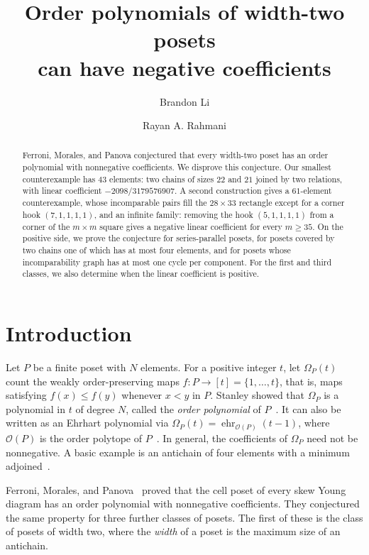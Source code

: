 \documentclass[11pt]{amsart}
\title{Order polynomials of width-two posets\\ can have negative coefficients}
\author{Brandon Li}
\author{Rayan A. Rahmani}
\theoremstyle{remark}
\numberwithin{equation}{section}
\begin{document}
\begin{abstract}
Ferroni, Morales, and Panova conjectured that every width-two poset has an
order polynomial with nonnegative coefficients. We disprove this conjecture.
Our smallest counterexample has $43$ elements: two chains of sizes $22$ and $21$
joined by two relations, with linear coefficient $-2098/3179576907$. A second
construction gives a $61$-element counterexample, whose incomparable pairs fill
the $28\times33$ rectangle except for a corner hook $(7,1,1,1,1)$, and an
infinite family: removing the hook $(5,1,1,1,1)$ from a corner of the
$m\times m$ square gives a negative linear coefficient for every $m\ge35$.
On the positive side, we prove the conjecture for series-parallel posets, for
posets covered by two chains one of which has at most four elements, and for
posets whose incomparability graph has at most one cycle per component. For the
first and third classes, we also determine when the linear coefficient is
positive.
\end{abstract}

\maketitle

\section{Introduction}

Let $P$ be a finite poset with $N$ elements. For a positive integer $t$, let
$\Omega_P(t)$ count the weakly order-preserving maps
$f\colon P\to[t]=\{1,\dots,t\}$, that is, maps satisfying $f(x)\le f(y)$
whenever $x<y$ in $P$. Stanley showed that $\Omega_P$ is a polynomial in $t$ of
degree $N$, called the \emph{order polynomial} of
$P$~\cite{Stanley1972,EC1}. It can also be written as an Ehrhart polynomial
via $\Omega_P(t)=\operatorname{ehr}_{\mathcal O(P)}(t-1)$, where $\mathcal O(P)$
is the order polytope of $P$~\cite{Stanley1986}. In general, the coefficients
of $\Omega_P$ need not be nonnegative. A basic example is an antichain of four
elements with a minimum adjoined~\cite[Section~8.7]{FMP}.

Ferroni, Morales, and Panova~\cite{FMP} proved that the cell poset of every
skew Young diagram has an order polynomial with nonnegative coefficients. They
conjectured the same property for three further classes of posets. The first of
these is the class of posets of width two, where the \emph{width} of a poset is
the maximum size of an antichain.
\end{document}
